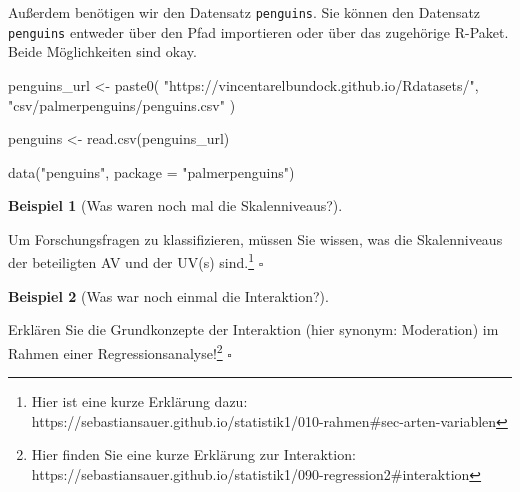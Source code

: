 \documentclass[
  ngerman,
  letterpaper,
  twoside,
  open=any]{scrbook}
\newenvironment{Shaded}{\begin{snugshade}}{\end{snugshade}}
\newcommand{\AttributeTok}[1]{\textcolor[rgb]{0.40,0.45,0.13}{#1}}
\newcommand{\FunctionTok}[1]{\textcolor[rgb]{0.28,0.35,0.67}{#1}}
\newcommand{\NormalTok}[1]{\textcolor[rgb]{0.00,0.23,0.31}{#1}}
\newcommand{\OtherTok}[1]{\textcolor[rgb]{0.00,0.23,0.31}{#1}}
\newcommand{\StringTok}[1]{\textcolor[rgb]{0.13,0.47,0.30}{#1}}
\theoremstyle{definition}
\newtheorem{example}{Beispiel}[chapter]
\theoremstyle{plain}
\theoremstyle{definition}
\theoremstyle{definition}
\theoremstyle{definition}
\newtheorem{example}{Beispiel}[chapter]
\theoremstyle{definition}
\theoremstyle{remark}
\begin{document}
Außerdem benötigen wir den Datensatz \texttt{penguins}. Sie können den
Datensatz \texttt{penguins} entweder über den Pfad importieren oder über
das zugehörige R-Paket. Beide Möglichkeiten sind okay.

\begin{Shaded}
\begin{Highlighting}[]
\NormalTok{penguins\_url }\OtherTok{\textless{}{-}} \FunctionTok{paste0}\NormalTok{(}
  \StringTok{"https://vincentarelbundock.github.io/Rdatasets/"}\NormalTok{,}
  \StringTok{"csv/palmerpenguins/penguins.csv"}
\NormalTok{)}

\NormalTok{penguins }\OtherTok{\textless{}{-}} \FunctionTok{read.csv}\NormalTok{(penguins\_url)}
\end{Highlighting}
\end{Shaded}

\begin{Shaded}
\begin{Highlighting}[]
\FunctionTok{data}\NormalTok{(}\StringTok{"penguins"}\NormalTok{, }\AttributeTok{package =} \StringTok{"palmerpenguins"}\NormalTok{)}
\end{Highlighting}
\end{Shaded}

\begin{example}[Was waren noch mal die
Skalenniveaus?]\protect\hypertarget{exm-skalenniveaus}{}\label{exm-skalenniveaus}

Um Forschungsfragen zu klassifizieren, müssen Sie wissen, was die
Skalenniveaus der beteiligten AV und der UV(s) sind.\footnote{Hier ist
  eine kurze Erklärung dazu:
  https://sebastiansauer.github.io/statistik1/010-rahmen\#sec-arten-variablen}
\(\square\)

\end{example}

\begin{example}[Was war noch einmal die
Interaktion?]\protect\hypertarget{exm-interaktion}{}\label{exm-interaktion}

Erklären Sie die Grundkonzepte der Interaktion (hier synonym:
Moderation) im Rahmen einer Regressionsanalyse!\footnote{Hier finden Sie
  eine kurze Erklärung zur Interaktion:
  https://sebastiansauer.github.io/statistik1/090-regression2\#interaktion}
\(\square\)

\end{example}
\end{document}
